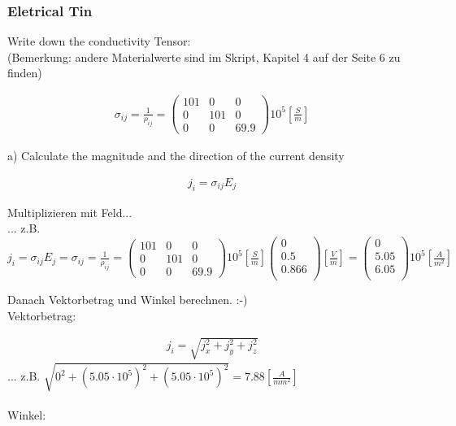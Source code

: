 \subsubsection{Eletrical Tin}
Write down the conductivity Tensor:\\
(Bemerkung: andere Materialwerte sind im Skript, Kapitel 4 auf der Seite 6 zu finden)

\begin{align}
\sigma_{ij} = \frac{1}{\rho_{ij}}= \begin{pmatrix}
101 & 0 & 0 \\
0 & 101 & 0 \\
0 & 0 & 69.9 
\end{pmatrix}
10^5 [\frac{S}{m}]
\end{align}



a) Calculate the magnitude and the direction of the current density

\begin{align}
j_i=\sigma_{ij}E_j
\end{align}

Multiplizieren mit Feld...
\\... z.B. $ j_i=\sigma_{ij}E_j = \sigma_{ij} = \frac{1}{\rho_{ij}}= \begin{pmatrix}
101 & 0 & 0 \\
0 & 101 & 0 \\
0 & 0 & 69.9 
\end{pmatrix} 10^5 [\frac{S}{m}] 
\begin{pmatrix}
0 \\
0.5 \\
0.866 \\
\end{pmatrix} [\frac{V}{m}] = 
\begin{pmatrix}
0 \\
5.05 \\
6.05 \\
\end{pmatrix} 10^5 [\frac{A}{m^2}]$



Danach Vektorbetrag und Winkel berechnen. :-)\\

Vektorbetrag: 

\begin{align}
j_i=\sqrt{j_x^2+j_y^2+j_z^2}
\end{align}
... z.B. $\sqrt{ 0^2+(5.05 \cdot 10^5)^2+(5.05 \cdot 10^5)^2 } = 7.88 [\frac{A}{mm^2}]$ 
\\
\\
Winkel:

